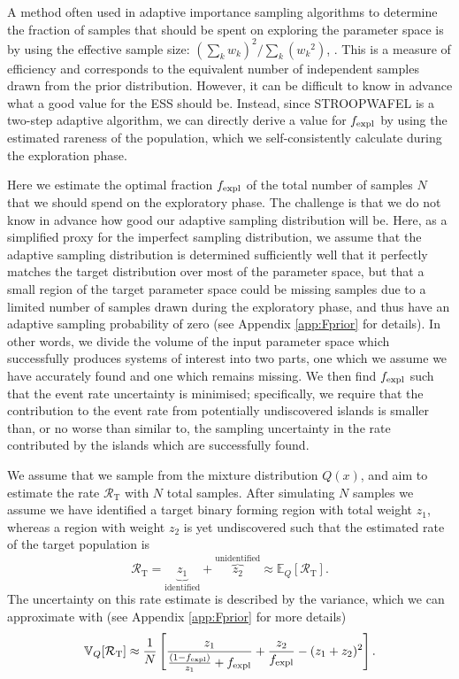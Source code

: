 \documentclass[a4paper,fleqn,usenatbib,useAMS,usedcolumn]{mnras}
\newcommand\rate{\mathcal{R}}
\newcommand{\AISs}{\textsc{STROOPWAFEL}}
\begin{document}
A method often used in adaptive importance sampling algorithms to determine the fraction of samples that should be spent on exploring the parameter space is by using the effective sample size: $(\sum_k {w_k})^2 / \sum_k({w_k}^2)$, \citep[ESS,][]{doi:10.1080/00401706.1995.10484303,liu2008monte}. This is a measure of efficiency and corresponds to the  equivalent number of independent  samples drawn from the prior distribution.
However, it can be difficult to know in advance what a good value for the ESS should be. Instead, since \AISs{} is a two-step adaptive algorithm, we can directly derive a value for $f_{\rm{expl}}$ by using the estimated rareness of the population, which we self-consistently calculate during the exploration phase. 

Here we estimate the optimal fraction $f_{\rm{expl}}$ of the total number of samples $N$ that we should spend on the exploratory phase.  The challenge is that we do not know in advance how good our adaptive sampling distribution will be.  Here, as a simplified proxy for the imperfect sampling distribution, we assume that the adaptive sampling distribution is determined sufficiently well that it perfectly matches the target distribution over most of the parameter space, but that a small region of the target parameter space could be missing samples due to a limited number of samples drawn during the exploratory phase, and thus have an adaptive sampling probability of zero (see Appendix \ref{app:Fprior} for details).  In other words, we divide the volume of the input parameter space which successfully produces systems of interest into two parts, one which we assume we have accurately found and one which remains missing. We then find $f_{\rm{expl}}$ such that the event rate uncertainty is minimised; specifically, we require that the contribution to the event rate from potentially undiscovered islands is smaller than, or no worse than similar to, the sampling uncertainty in the rate contributed by the islands which are successfully found.

We assume that we sample from the mixture distribution $Q(x)$, and aim to estimate the rate $\rate_{\text{T}} $ with $N$ total samples.   After simulating $N$ samples we assume we have identified a target binary forming region with total weight $z_1$, whereas a region with weight $z_2$ is yet undiscovered such that the estimated rate of the target population is 
%
\begin{equation}
	\rate_{\text{T}} =  \underbrace{z_1}_{\text{identified}} + \overbrace{z_2}^{\text{unidentified}} \approx {\mathbb{E}_Q[\rate_{\text{T}}]}. 	 %
	\label{eq:EstimateFexpl}
\end{equation}
%
The uncertainty on this rate estimate is described by the variance, which we can approximate with (see Appendix \ref{app:Fprior} for more details)
%
\begin{equation}
	\mathbb{V}_Q[\rate_{\text{T}}] \approx \frac{1}{N} \left[  \frac{z_1}{\frac{(1-f_{\rm{expl}})}{z_1} + f_{\rm{expl}}}  + \frac{z_2}{f_{\rm{expl}}} - (z_1 + z_2)^2    		\right].	
	\label{eq:VarFprior}
\end{equation}
%
\end{document}
